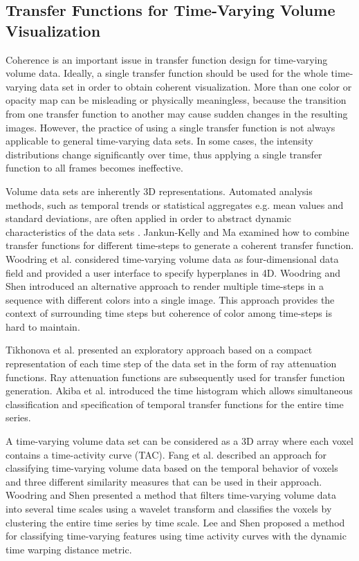 \subsection{Transfer Functions for Time-Varying Volume Visualization}
Coherence is an important issue in transfer function design for time-varying volume data. Ideally, a single transfer function should be used for the whole time-varying data set in order to obtain coherent visualization. More than one color or opacity map can be misleading or physically meaningless, because the transition from one transfer function to another may cause sudden changes in the resulting images. However, the practice of using a single transfer function is not always applicable to general time-varying data sets. In some cases, the intensity distributions change significantly over time, thus applying a single transfer function to all frames becomes ineffective.

Volume data sets are inherently 3D representations. Automated analysis methods, such as temporal trends or statistical aggregates e.g. mean values and standard deviations, are often applied in order to abstract dynamic characteristics of the data sets \cite{kehrer_visualization_2013}.
Jankun-Kelly and Ma \cite{jankun-kelly_study_2001} examined how to combine transfer functions for different time-steps to generate a coherent transfer function.
Woodring et al. \cite{woodring_high_2003} considered time-varying volume data as four-dimensional data field and provided a user interface to specify hyperplanes in 4D.
Woodring and Shen \cite{woodring_chronovolumes_2003} introduced an alternative approach to render multiple time-steps in a sequence with different colors into a single image. This approach provides the context of surrounding time steps but coherence of color among time-steps is hard to maintain.

Tikhonova et al. \cite{tikhonova_exploratory_2010} presented an exploratory approach based on a compact representation of each time step of the data set in the form of ray attenuation functions. Ray attenuation functions are subsequently used for transfer function generation.
Akiba et al. \cite{akiba_simultaneous_2006} introduced the time histogram which allows simultaneous classification and specification of temporal transfer functions for the entire time series.

A time-varying volume data set can be considered as a 3D array where each voxel contains a time-activity curve (TAC). Fang et al. \cite{fang_visualization_2007} described an approach for classifying time-varying volume data based on the temporal behavior of voxels and three different similarity measures that can be used in their approach.
Woodring and Shen \cite{woodring_multiscale_2009} presented a method that filters time-varying volume data into several time scales using a wavelet transform and classifies the voxels by clustering the entire time series by time scale.
Lee and Shen \cite{lee_visualizing_2009} proposed a method for classifying time-varying features using time activity curves with the dynamic time warping distance metric.

